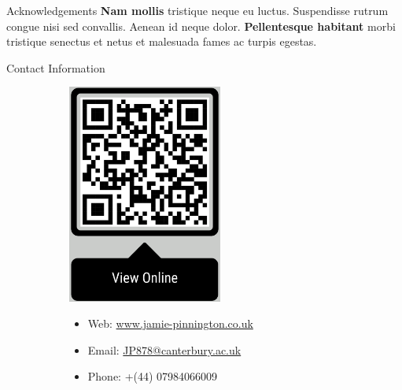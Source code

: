 \documentclass{beamer} %
\begin{document}
\begin{frame}[t]
\begin{columns}[t]
\begin{column}{0.3\textwidth}
			\begin{block}{Acknowledgements}
				\textbf{Nam mollis} tristique neque eu luctus. Suspendisse rutrum congue nisi sed convallis. Aenean id neque dolor. \textbf{Pellentesque habitant} morbi tristique senectus et netus et malesuada fames ac turpis egestas.
			\end{block}



			\begin{block}{Contact Information}
				\begin{figure}
					\begin{subfigure}[t]{0.25\linewidth}
						\centering
						\includegraphics[width=2in,valign=t]{qr_online_v6.png}
					\end{subfigure}
					\begin{subfigure}[t]{0.45\linewidth}
						\begin{itemize}
							\item Web: \href{https://www.jamie-pinnington.co.uk}{www.jamie-pinnington.co.uk}
							\item Email: \href{mailto:JP878@canterbury.ac.uk}{JP878@canterbury.ac.uk}
							\item Phone: +(44) 07984066009
						\end{itemize}
					\end{subfigure}
					\begin{subfigure}[t]{0.25\linewidth}
						\centering

\end{subfigure}
\end{figure}
\end{block}
\end{column}
\end{columns}
\end{frame}
\end{document}
